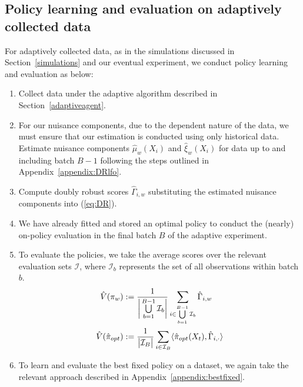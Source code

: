 \documentclass[letterpaper, 12pt, parskip=full,]{scrartcl}
\begin{document}
\subsection{Policy learning and evaluation on adaptively collected data}\label{adaptiveearning}%
For adaptively collected data, as in the simulations discussed in Section~\ref{simulations} and our eventual experiment, we conduct policy learning and evaluation as below:

\begin{enumerate}
\item Collect data under the adaptive algorithm described in Section~\ref{adaptiveagent}. 
\item For our nuisance components, due to the dependent nature of the data, we must ensure that our estimation is conducted using only historical data. Estimate nuisance components $\hat{\mu}_{w}(X_i)$  and $\hat\xi_w(X_i)$ for data up to and including batch $B-1$ following the steps outlined in Appendix~\ref{appendix:DRlfo}. 
\item Compute doubly robust scores $\hat{\Gamma}_{i,w}$ substituting the estimated nuisance components into (\ref{eq:DR}). 
\item We have already fitted and stored an optimal policy to conduct the (nearly) on-policy evaluation in the final batch $B$ of the adaptive experiment. 
  \item To evaluate the policies, we take the average scores over the relevant evaluation sets $\mathcal{I}$, where $\mathcal{I}_b$ represents the set of all observations within batch $b$. %
      \begin{align}
          \hat{V}({\pi}_{w})  &:= \frac{1}{\bigg{\lvert} \bigcup\limits_{b=1}^{B-1} \mathcal{I}_{b} \bigg{\rvert}} \sum_{i \in \bigcup\limits_{b=1}^{B-1} \mathcal{I}_{b} } \hat{\Gamma}_{i,w} \\
                     \hat{V}(\hat{\pi}_{opt})  &:= \frac{1}{\big{\lvert}  \mathcal{I}_{B} \big{\rvert}} \sum_{i \in \mathcal{I}_{B} }
          \langle \hat{\pi}_{opt}(X_{t}), \hat{\Gamma}_{i, \cdot} \rangle
    \end{align}
   \item To learn and evaluate the best fixed policy on a dataset, we again take the relevant approach described in Appendix~\ref{appendix:bestfixed}. 
\end{enumerate}
\end{document}
